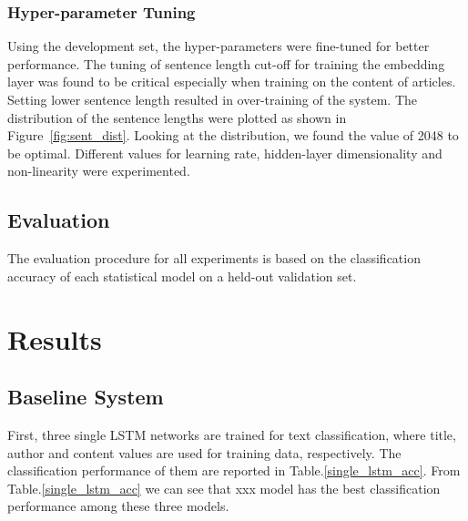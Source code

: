 \documentclass[12pt]{article}
\begin{document}
\subsubsection{Hyper-parameter Tuning}
Using the development set, the hyper-parameters were fine-tuned for better performance. The tuning of sentence length cut-off for training the embedding layer was found to be critical especially when training on the content of articles. Setting lower sentence length resulted in over-training of the system. The distribution of the sentence lengths were plotted as shown in Figure~\ref{fig:sent_dist}. Looking at the distribution, we found the value of 2048 to be optimal. Different values for learning rate, hidden-layer dimensionality and non-linearity were experimented. 



\subsection{Evaluation}
The evaluation procedure for all experiments is based on the classification accuracy of each statistical model on a held-out validation set.

\section{Results}\label{results}

\subsection{Baseline System}

First, three single LSTM networks are trained for text classification, where title, author and content values are used for training data, respectively. The classification performance of them are reported in Table.\ref{single_lstm_acc}. From Table.\ref{single_lstm_acc} we can see that xxx model has the best classification performance among these three models.
\end{document}
